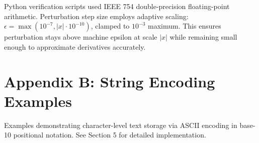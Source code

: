 \documentclass[12pt, a4paper]{article}
\theoremstyle{note}
\begin{document}
Python verification scripts used IEEE 754 double-precision floating-point arithmetic. Perturbation step size employs adaptive scaling: $\epsilon = \max(10^{-7}, |x| \cdot 10^{-10})$, clamped to $10^{-3}$ maximum. This ensures perturbation stays above machine epsilon at scale $|x|$ while remaining small enough to approximate derivatives accurately.

\section*{Appendix B: String Encoding Examples}

Examples demonstrating character-level text storage via ASCII encoding in base-10 positional notation. See Section 5 for detailed implementation.
\end{document}

